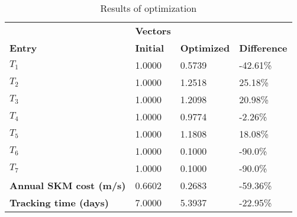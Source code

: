 \begin{table}[H]
\centering
\begin{tabular}{llll}
\textbf{}      & \cellcolor[HTML]{EFEFEF}\textbf{Vectors} & \textbf{} & \textbf{}         \\
\rowcolor[HTML]{EFEFEF} 
\textbf{Entry} & \textbf{Initial} & \textbf{Optimized} & \textbf{Difference} \\
$T_1$ & 1.0000 & 0.5739 & -42.61\% \\ 
$T_2$ & 1.0000 & 1.2518 & 25.18\% \\ 
$T_3$ & 1.0000 & 1.2098 & 20.98\% \\ 
$T_4$ & 1.0000 & 0.9774 & -2.26\% \\ 
$T_5$ & 1.0000 & 1.1808 & 18.08\% \\ 
$T_6$ & 1.0000 & 0.1000 & -90.0\% \\ 
$T_7$ & 1.0000 & 0.1000 & -90.0\% \\ 
\rowcolor[HTML]{EFEFEF} 
\textbf{Annual SKM cost (m/s)}  & 0.6602 & 0.2683 & -59.36\% \\ 
\rowcolor[HTML]{EFEFEF} 
\textbf{Tracking time (days)}  & 7.0000 & 5.3937 & -22.95\% \\ 
\end{tabular}
\caption{Results of optimization}
\label{tab:OptimizationAnalysis}
\end{table}